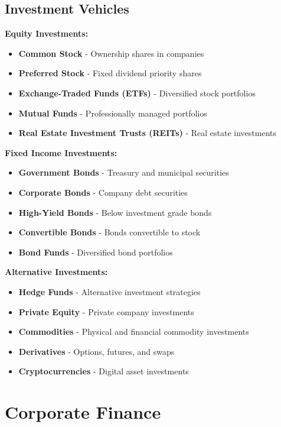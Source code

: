 \documentclass[12pt]{article}
\begin{document}
\subsection{Investment Vehicles}

\textbf{Equity Investments:}
\begin{itemize}
    \item \textbf{Common Stock} - Ownership shares in companies
    \item \textbf{Preferred Stock} - Fixed dividend priority shares
    \item \textbf{Exchange-Traded Funds (ETFs)} - Diversified stock portfolios
    \item \textbf{Mutual Funds} - Professionally managed portfolios
    \item \textbf{Real Estate Investment Trusts (REITs)} - Real estate investments
\end{itemize}

\textbf{Fixed Income Investments:}
\begin{itemize}
    \item \textbf{Government Bonds} - Treasury and municipal securities
    \item \textbf{Corporate Bonds} - Company debt securities
    \item \textbf{High-Yield Bonds} - Below investment grade bonds
    \item \textbf{Convertible Bonds} - Bonds convertible to stock
    \item \textbf{Bond Funds} - Diversified bond portfolios
\end{itemize}

\textbf{Alternative Investments:}
\begin{itemize}
    \item \textbf{Hedge Funds} - Alternative investment strategies
    \item \textbf{Private Equity} - Private company investments
    \item \textbf{Commodities} - Physical and financial commodity investments
    \item \textbf{Derivatives} - Options, futures, and swaps
    \item \textbf{Cryptocurrencies} - Digital asset investments
\end{itemize}

\section{Corporate Finance}
\end{document}

